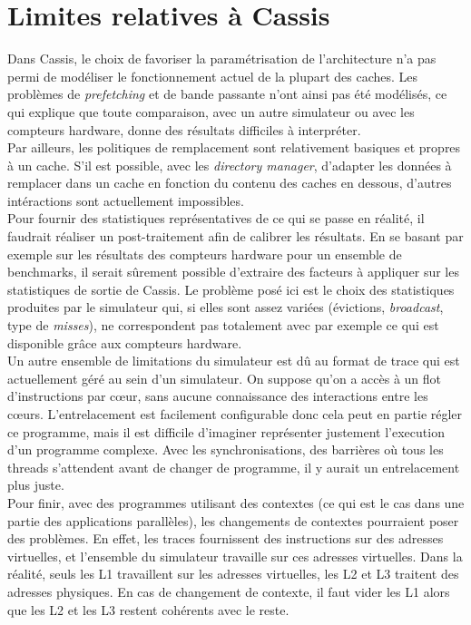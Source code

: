 \section{Limites relatives à \textsf{Cassis}}

Dans \textsf{Cassis}, le choix de favoriser la paramétrisation de l'architecture n'a pas permi de modéliser le fonctionnement actuel de la plupart des caches. Les problèmes de \emph{prefetching} et de bande passante n'ont ainsi pas été modélisés, ce qui explique que toute comparaison, avec un autre simulateur ou avec les compteurs hardware, donne des résultats difficiles à interpréter. \\

Par ailleurs, les politiques de remplacement sont relativement basiques et propres à un cache. S'il est possible, avec les \emph{directory manager}, d'adapter les données à remplacer dans un cache en fonction du contenu des caches en dessous, d'autres intéractions sont actuellement impossibles. \\

Pour fournir des statistiques représentatives de ce qui se passe en réalité, il faudrait réaliser un post-traitement afin de calibrer les résultats. En se basant par exemple sur les résultats des compteurs hardware pour un ensemble de benchmarks, il serait sûrement possible d'extraire des facteurs à appliquer sur les statistiques de sortie de \textsf{Cassis}. Le problème posé ici est le choix des statistiques produites par le simulateur qui, si elles sont assez variées (évictions, \emph{broadcast}, type de \emph{misses}), ne correspondent pas totalement avec par exemple ce qui est disponible grâce aux compteurs hardware. \\

Un autre ensemble de limitations du simulateur est dû au format de trace qui est actuellement géré au sein d'un simulateur. On suppose qu'on a accès à un flot d'instructions par c{\oe}ur, sans aucune connaissance des interactions entre les c{\oe}urs. L'entrelacement est facilement configurable donc cela peut en partie régler ce programme, mais il est difficile d'imaginer représenter justement l'execution d'un programme complexe. Avec les synchronisations, des barrières où tous les threads s'attendent avant de changer de programme, il y aurait un entrelacement plus juste. \\

Pour finir, avec des programmes utilisant des contextes (ce qui est le cas dans une partie des applications parallèles), les changements de contextes pourraient poser des problèmes. En effet, les traces fournissent des instructions sur des adresses virtuelles, et l'ensemble du simulateur travaille sur ces adresses virtuelles. Dans la réalité, seuls les L1 travaillent sur les adresses virtuelles, les L2 et L3 traitent des adresses physiques. En cas de changement de contexte, il faut vider les L1 alors que les L2 et les L3 restent cohérents avec le reste.

